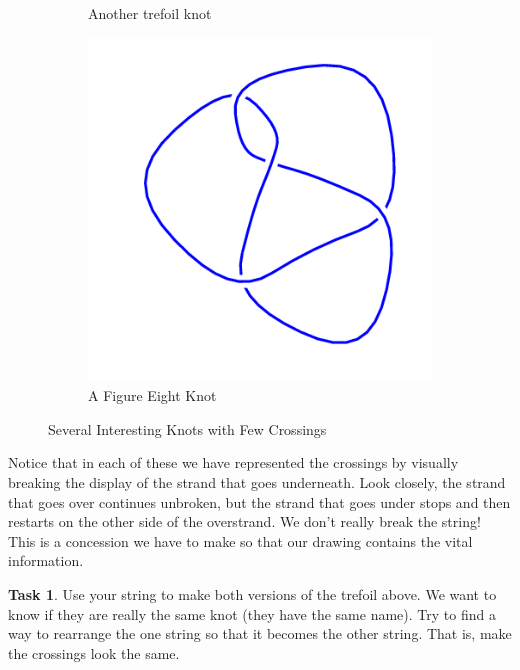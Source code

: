 \documentclass[12pt,letterpaper]{article}
\theoremstyle{definition}
\newtheorem{task}[question]{Task}
\begin{document}
\begin{figure}[h]
\begin{subfigure}[b]{0.25\textwidth}
        \caption{Another trefoil knot}
    \end{subfigure}
    \hspace{1cm}
    \begin{subfigure}[b]{0.25\textwidth}
        \centering
        \includegraphics[width=\textwidth]{knotpics/4_1.png}
        \caption{A Figure Eight Knot}
    \end{subfigure}
    \caption{Several Interesting Knots with Few Crossings}
\end{figure}

Notice that in each of these we have represented the crossings by visually breaking the display of the strand that goes underneath. 
Look closely, the strand that goes over continues unbroken, but the strand that goes under stops and then restarts on the other side of the overstrand.
We don't really break the string!
This is a concession we have to make so that our drawing contains the vital information.



\begin{task}
Use your string to make both versions of the trefoil above. 
We want to know if they are really the same knot (they have the same name).
Try to find a way to rearrange the one string so that it becomes the other string.
That is, make the crossings look the same.
\end{task}
\end{document}

